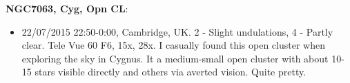 {\bf NGC7063, Cyg, Opn CL}:
\begin{itemize}
\item 22/07/2015 22:50-0:00, Cambridge, UK. 2 - Slight undulations, 4 - Partly clear. Tele Vue 60 F6, 15x, 28x. I casually found this open cluster when exploring the sky in Cygnus. It a medium-small open cluster with about 10-15 stars visible directly and others via averted vision. Quite pretty.
\end{itemize}
